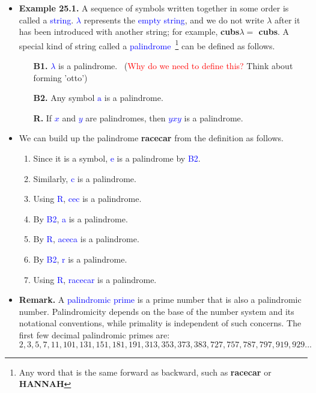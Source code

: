 \documentclass[aspectratio=169]{beamer}
\providecommand{\Blue}[1]{\textcolor{blue}{#1}}
\providecommand{\Red}[1]{\textcolor{red}{#1}}
\begin{document}
\begin{frame}[plain]{}

 \begin{itemize}
  \item  {\bf Example 25.1.} A sequence of symbols written together in some order is called a \Blue{string}.
    \Blue{$\lambda$} represents the \Blue{empty string}, and we do not write $\lambda$ after it has been introduced 
    with another string; for example, {\bf cubs$\lambda =$ cubs}.
    A special kind of string called a \Blue{palindrome}~\footnote{Any word that is the same forward as backward,
      such as {\bf racecar} or {\bf HANNAH}}
    can be defined as follows.
    \begin{itemize}
      \item[{\bf B1.}] \Blue{$\lambda$} is a palindrome. \ {\small (\Red{Why do we need to define this?} Think about forming 'otto')}
      \item[{\bf B2.}] Any symbol \Blue{$\mathrm{a}$} is a palindrome.
      \item[{\bf R.}] If \Blue{$x$} and \Blue{$y$} are palindromes, then \Blue{$yxy$} is a palindrome.
    \end{itemize}
  \item We can build up the palindrome {\bf racecar} from the definition as follows.\pause
    \begin{enumerate}
     \item Since it is a symbol, \Blue{e} is a palindrome by \Blue{B2}. \pause
     \item Similarly, \Blue{c} is a palindrome. \pause
     \item Using \Blue{R}, \Blue{cec} is a palindrome. \pause
     \item By \Blue{B2}, \Blue{a} is a palindrome. \pause
      \item By \Blue{R}, \Blue{aceca} is a palindrome. \pause
      \item By \Blue{B2}, \Blue{r} is a palindrome. \pause
      \item Using \Blue{R}, \Blue{racecar} is a palindrome. 
    \end{enumerate}
     
 \end{itemize}

\end{frame}

\iffalse
\begin{frame}[plain]{}

 \begin{itemize}
  \item  {\bf Remark.} A \Blue{palindromic prime}  is a prime number that is also a palindromic number.   
  Palindromicity depends on the base of the number system and its notational conventions, 
  while primality is independent of such concerns. The first few decimal palindromic primes are:
 \[ 2, 3, 5, 7, 11, 101, 131, 151, 181, 191, 313, 353, 373, 383, 727, 757, 787, 797, 919, 929... \]
 
 \end{itemize}
 
 \vspace{1in}
 

\end{frame}
\end{document}
